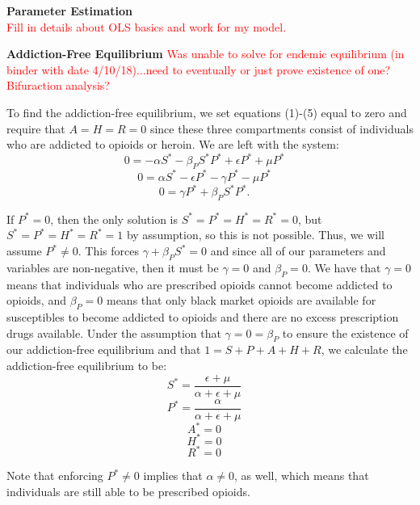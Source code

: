 \documentclass[12pt]{article}
\begin{document}
\textbf{Parameter Estimation} \\
\textcolor{red}{Fill in details about OLS basics and work for my model.}






 \textbf{Addiction-Free Equilibrium} 
\textcolor{red}{Was unable to solve for endemic equilibrium (in binder with date 4/10/18)...need to eventually or just prove existence of one? Bifuraction analysis?}

To find the addiction-free equilibrium, we set equations (1)-(5) equal to zero and require that $A=H=R=0$ since these three compartments consist of individuals who are addicted to opioids or heroin. We are left with the system: \\
\[0=-\alpha S^* -\beta_{P} S^* P^* + \epsilon P^* +\mu P^* \quad\]
\[0=\alpha S^* - \epsilon P^* -\gamma P^* - \mu P^* \quad\]
\[0=\gamma P^* + \beta_{P} S^* P^*.   \quad\]



If $P^*=0$, then the only solution is $S^*=P^*=H^*=R^*=0$, but $S^*=P^*=H^*=R^*=1$ by assumption, so this is not possible. Thus, we will assume $P^* \neq 0. $ This forces $\gamma + \beta_{P} S^* =0$ and since all of our parameters and variables are non-negative, then it must be $\gamma=0$ and $\beta_{P}=0$. We have that $\gamma=0$ means that individuals who are prescribed opioids cannot become addicted to opioids, and $\beta_{P}=0$ means that only black market opioids are available for susceptibles to become addicted to opioids and there are no excess prescription drugs available. Under the assumption that $\gamma=0=\beta_{P}$ to ensure the existence of our addiction-free equilibrium and that $1=S+P+A+H+R$, we calculate the addiction-free equilibrium to be: \\

\[S^*=\frac{\epsilon + \mu}{\alpha + \epsilon +\mu}\quad\]
\[P^*=\frac{\alpha}{\alpha + \epsilon +\mu}\quad\]
\[A^*=0\quad\]
\[H^*=0\quad\]
\[R^*=0\quad\] 

Note that enforcing $P^* \neq 0$ implies that $\alpha \neq 0$, as well, which means that individuals are still able to be prescribed opioids. 
\end{document}
